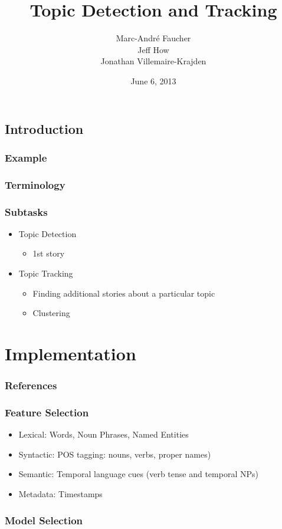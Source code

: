 \documentclass{beamer}
\title{Topic Detection and Tracking}
\author{
Marc-André Faucher\\
Jeff How\\
Jonathan Villemaire-Krajden}
\date{June 6, 2013}
\begin{document}
\begin{frame}[plain]
\section{Introduction}
\frametitle{Example}
\titlepage
\end{frame}

\begin{frame}[plain]
\frametitle{Terminology}
\end{frame}

\begin{frame}
\frametitle{Subtasks}
\begin{itemize}
\item Topic Detection
\begin{itemize}
\item 1st story
\end{itemize}
\item Topic Tracking
\begin{itemize}
\item Finding additional stories about a particular topic
\item Clustering
\end{itemize}
\end{itemize}
\end{frame}

\section{Implementation}
\begin{frame}
\frametitle{References}
\end{frame}

\begin{frame}
\frametitle{Feature Selection}
\begin{itemize}
\item Lexical: Words, Noun Phrases, Named Entities
\item Syntactic: POS tagging: nouns, verbs, proper names)
\item Semantic: Temporal language cues (verb tense and temporal NPs)\cite{Makkonen:2003:UTITDT}
\item Metadata: Timestamps
\end{itemize}
\end{frame}

\begin{frame}
\frametitle{Model Selection}
\end{frame}
\end{document}
